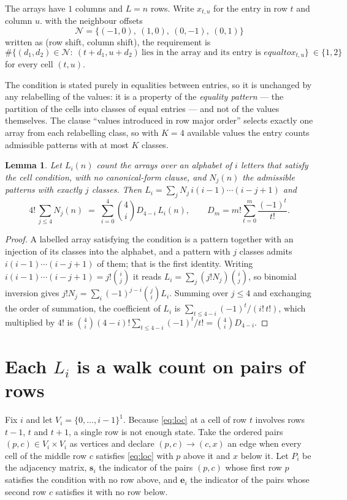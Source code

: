 \documentclass[11pt,a4paper]{article}
\theoremstyle{plain}
\newtheorem{lemma}[theorem]{Lemma}
\theoremstyle{definition}
\begin{document}
The arrays have $1$ columns and $L=n$ rows. Write $x_{t,u}$ for the entry in
row $t$ and column $u$. with the neighbour offsets
\[
\mathcal N=\{(-1,0),\ (1,0),\ (0,-1),\ (0,1)\}
\]
written as (row shift, column shift), the requirement is
\begin{equation}\label{eq:loc}
\#\bigl\{(d_1,d_2)\in\mathcal N:\ (t+d_1,u+d_2)\ \text{lies in the array and its entry is }
equal to x_{t,u}\bigr\}\ \in\{1,2\}
\end{equation}
for every cell $(t,u)$.

The condition is stated purely in equalities between entries, so it is unchanged by any
relabelling of the values: it is a property of the \emph{equality pattern} --- the partition
of the cells into classes of equal entries --- and not of the values themselves. The clause
``values introduced in row major order'' selects exactly one array from each relabelling
class, so with $K=4$ available values the entry counts admissible patterns with at most $K$
classes.

\begin{lemma}\label{lem:inv}
Let $L_i(n)$ count the arrays over an alphabet of $i$ letters that satisfy the cell
condition, with no canonical-form clause, and $N_j(n)$ the admissible patterns with exactly
$j$ classes. Then $L_i=\sum_j N_j\,i(i-1)\cdots(i-j+1)$ and
\[
4!\,\sum_{j\le 4}N_j(n)\;=\;\sum_{i=0}^{4}\binom{4}{i}D_{4-i}\,L_i(n),
\qquad D_m=m!\sum_{t=0}^{m}\frac{(-1)^t}{t!} .
\]
\end{lemma}

\begin{proof}
A labelled array satisfying the condition is a pattern together with an injection of its
classes into the alphabet, and a pattern with $j$ classes admits $i(i-1)\cdots(i-j+1)$ of
them; that is the first identity. Writing $i(i-1)\cdots(i-j+1)=j!\binom{i}{j}$ it reads
$L_i=\sum_j(j!N_j)\binom{i}{j}$, so binomial inversion gives
$j!N_j=\sum_i(-1)^{j-i}\binom{j}{i}L_i$. Summing over $j\le4$ and exchanging the
order of summation, the coefficient of $L_i$ is
$\sum_{t\le4-i}(-1)^t/(i!\,t!)$, which multiplied by $4!$ is
$\binom{4}{i}(4-i)!\sum_{t\le4-i}(-1)^t/t!=\binom{4}{i}D_{4-i}$.
\end{proof}

\section{Each $L_i$ is a walk count on pairs of rows}

Fix $i$ and let $V_i=\{0,\dots,i-1\}^{1}$. Because \eqref{eq:loc} at a cell of row
$t$ involves rows $t-1$, $t$ and $t+1$, a single row is not enough state. Take the
ordered pairs $(p,c)\in V_i\times V_i$ as vertices and declare $(p,c)\to(c,x)$ an edge when
every cell of the middle row $c$ satisfies \eqref{eq:loc} with $p$ above it and $x$
below it. Let $P_i$ be the adjacency matrix, $\mathbf{s}_i$ the indicator of the pairs
$(p,c)$ whose first row $p$ satisfies the condition with no row above, and
$\mathbf{e}_i$ the indicator of the pairs whose second row $c$ satisfies it with no
row below.
\end{document}
